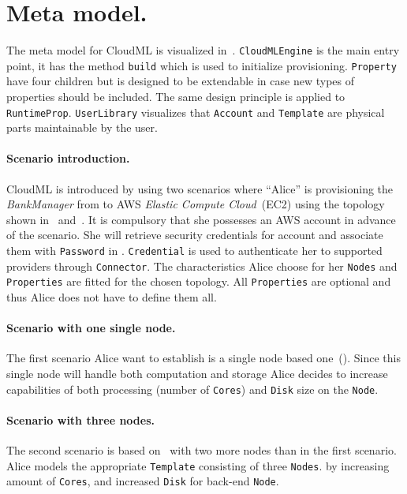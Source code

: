 




\section{Meta model.}

The meta model for CloudML is visualized in~. 
\texttt{CloudMLEngine} is the main entry point, it has the method \texttt{build}
which is used to initialize provisioning.
\texttt{Property} have four children but is designed to be extendable in case
new types of properties should be included. The same design principle
is applied to \texttt{RuntimeProp}.
\texttt{UserLibrary} visualizes that \texttt{Account} and \texttt{Template} are 
physical parts maintainable by the user.

\paragraph{Scenario introduction.}
CloudML is introduced by using two scenarios where ``Alice'' is provisioning the 
\emph{BankManager} from  to AWS \emph{Elastic Compute Cloud}~(EC2)
using the topology shown in~ and~.
It is compulsory that she possesses an AWS account in advance of the scenario.
She will retrieve security credentials for account 
and associate them with \texttt{Password} in .
\texttt{Credential} is used to authenticate her to supported providers through \texttt{Connector}.
The characteristics Alice choose for her \texttt{Nodes} and \texttt{Properties} are fitted
for the chosen topology.
All \texttt{Properties} are optional and thus Alice does not have to define them all.

\paragraph{Scenario with one single node.}
The first scenario Alice want to establish is a single node based one~().
Since this single node will handle both computation and storage Alice decides to 
increase capabilities of both processing (number of \texttt{Cores}) and 
\texttt{Disk} size on the \texttt{Node}.

\paragraph{Scenario with three nodes.}
The second scenario is based on~ with two more nodes than in the first scenario.
Alice models the appropriate \texttt{Template} consisting
of three \texttt{Nodes}.
by increasing amount of \texttt{Cores}, and increased \texttt{Disk} for back-end \texttt{Node}.

